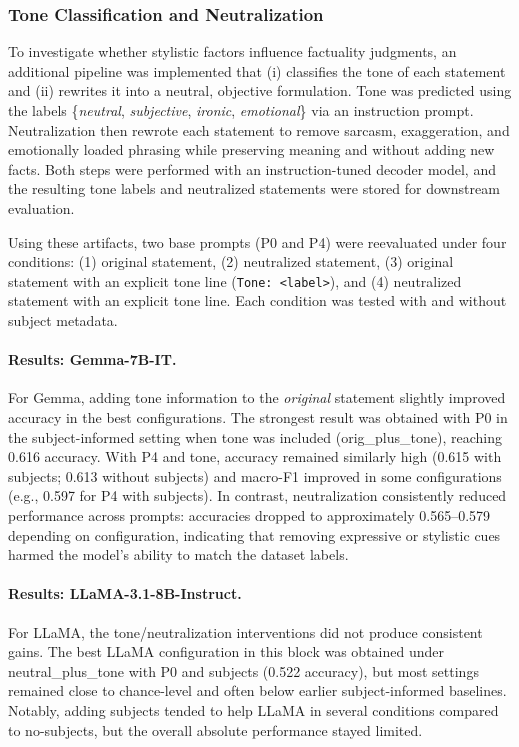 \subsubsection{Tone Classification and Neutralization}

To investigate whether stylistic factors influence factuality judgments, an additional pipeline was implemented that (i) classifies the tone of each statement and (ii) rewrites it into a neutral, objective formulation. Tone was predicted using the labels \{\textit{neutral}, \textit{subjective}, \textit{ironic}, \textit{emotional}\} via an instruction prompt. Neutralization then rewrote each statement to remove sarcasm, exaggeration, and emotionally loaded phrasing while preserving meaning and without adding new facts. Both steps were performed with an instruction-tuned decoder model, and the resulting tone labels and neutralized statements were stored for downstream evaluation.

Using these artifacts, two base prompts (P0 and P4) were reevaluated under four conditions: (1) original statement, (2) neutralized statement, (3) original statement with an explicit tone line (\texttt{Tone: <label>}), and (4) neutralized statement with an explicit tone line. Each condition was tested with and without subject metadata.

\paragraph{Results: Gemma-7B-IT.}
For Gemma, adding tone information to the \emph{original} statement slightly improved accuracy in the best configurations. The strongest result was obtained with P0 in the subject-informed setting when tone was included (orig\_plus\_tone), reaching 0.616 accuracy. With P4 and tone, accuracy remained similarly high (0.615 with subjects; 0.613 without subjects) and macro-F1 improved in some configurations (e.g., 0.597 for P4 with subjects). In contrast, neutralization consistently reduced performance across prompts: accuracies dropped to approximately 0.565--0.579 depending on configuration, indicating that removing expressive or stylistic cues harmed the model's ability to match the dataset labels.

\paragraph{Results: LLaMA-3.1-8B-Instruct.}
For LLaMA, the tone/neutralization interventions did not produce consistent gains. The best LLaMA configuration in this block was obtained under neutral\_plus\_tone with P0 and subjects (0.522 accuracy), but most settings remained close to chance-level and often below earlier subject-informed baselines. Notably, adding subjects tended to help LLaMA in several conditions compared to no-subjects, but the overall absolute performance stayed limited.

